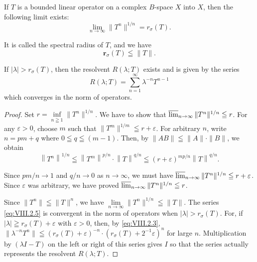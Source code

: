 \begin{theorem}\label{thm:VIII.2.Theorem.3} If $T$ is a bounded linear operator on a complex $B$-space $X$ into $X$, then the following limit exists: 
\begin{equation}\label{eq:VIII.2.3}
\lim\limits _{n \rightarrow \infty} \| T ^{n} \| ^{1/n} = r _{\sigma} (T).
\end{equation}
\end{theorem}

It is called the spectral radius of $T$, and we have 
\begin{equation}\label{eq:VIII.2.4}
\boldsymbol {r} _{\sigma} (T) \leqq \| T \|.
\end{equation}

If $|\lambda| > r_{\sigma}(T)$, then the resolvent $R(\lambda; T)$ exists and is given by the series 
\begin{equation}\label{eq:VIII.2.5}
R (\lambda ; T) = \sum\limits_{n=1} ^{\infty} \lambda^{-n} T ^{n-1}
\end{equation}
which converges in the norm of operators. 

\begin{proof}
 Set $r = \inf\limits_{n \geqq 1} \|T^n\|^{1/n}$. We have to show that $\varlimsup\limits_{n \to \infty} \|T^n\|^{1/n} \leqq r$. For any $\varepsilon > 0$, choose $m$ such that $\|T^m\|^{1/m} \leqq r + \varepsilon$. For arbitrary $n$, write $n = p m + q$ where $0 \leqq q \leqq (m - 1)$. Then, by $\|AB\| \leqq \|A\| \cdot \|B\|$, we obtain 
\[
\left\| T ^{n} \right\| ^{1/n} \leqq \left\| T ^{m} \right\| ^{p/n} \cdot \left\| T \right\| ^{q/n} \leqq (r + \varepsilon) ^{mp/n} \left\| T \right\| ^{q/n}. \]

Since $pm / n \to 1$ and $q / n \to 0$ as $n \to \infty$, we must have $\varlimsup\limits_{n \to \infty} \|T^n\|^{1/n} \leqq r + \varepsilon$. Since $\varepsilon$ was arbitrary, we have proved $\varlimsup\limits_{n \to \infty} \|T^n\|^{1/n} \leqq r$. 

Since $\|T^n\| \leqq \|T\|^n$, we have $\lim\limits_{n \to \infty} \|T^n\|^{1/n} \leqq \|T\|$. The series \eqref{eq:VIII.2.5} is convergent in the norm of operators when $|\lambda| > r_\sigma(T)$. For, if $|\lambda| \geqq r_\sigma(T) + \varepsilon$ with $\varepsilon > 0$, then, by \eqref{eq:VIII.2.3}, $\|\lambda^{-n}T^n\| \leqq (r_\sigma(T) + \varepsilon)^{-n} \cdot (r_\sigma(T) + 2^{-1}\varepsilon)^n$ for large $n$. Multiplication by $(\lambda I - T)$ on the left or right of this series gives $I$ so that the series actually represents the resolvent $R(\lambda; T)$. 
\end{proof}

